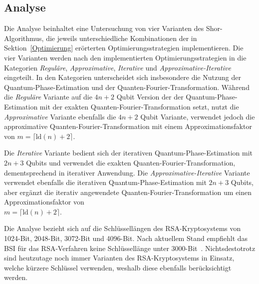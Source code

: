 \subsection*{Analyse}
Die Analyse beinhaltet eine Untersuchung von vier Varianten des Shor-Algorithmus, 
die jeweils unterschiedliche Kombinationen der in Sektion~\ref{Optimierung} erörterten Optimierungsstrategien implementieren.
Die vier Varianten werden nach den implementierten Optimierungsstrategien in die Kategorien \textit{Reguläre}, 
\textit{Approximative}, \textit{Iterative} und \textit{Approximative-Iterative} eingeteilt.
In den Kategorien unterscheidet sich insbesondere die Nutzung der Quantum-Phase-Estimation und der Quanten-Fourier-Transformation. 
Während die \textit{Reguläre} Variante auf die \(4n+2\) Qubit Version der der Quantum-Phase-Estimation mit der exakten Quanten-Fourier-Transformation setzt, 
nutzt die \textit{Approximative} Variante ebenfalls die \(4n+2\) Qubit Variante, 
verwendet jedoch die approximative Quanten-Fourier-Transformation mit einem Approximationsfaktor von \(m = \lceil\text{ld}(n)+2\rceil\).

Die \textit{Iterative} Variante bedient sich der iterativen Quantum-Phase-Estimation mit \(2n+3\) Qubits und 
verwendet die exakten Quanten-Fourier-Transformation, dementsprechend in iterativer Anwendung.
Die \textit{Approximative-Iterative} Variante verwendet ebenfalls die iterativen Quantum-Phase-Estimation mit \(2n+3\) Qubits, 
aber ergänzt die iterativ angewendete Quanten-Fourier-Transformation um einen Approximationsfaktor von \\\(m = \lceil\text{ld}(n)+2\rceil\).

Die Analyse bezieht sich auf die Schlüssellängen des RSA-Kryptosystems von 1024-Bit, 2048-Bit, 3072-Bit und 4096-Bit. 
Nach aktuellem Stand empfiehlt das BSI für das RSA-Verfahren keine Schlüssellänge unter 3000-Bit~\cite{BSI2023}. 
Nichtsdestotrotz sind heutzutage noch immer Varianten des RSA-Kryptosystems in Einsatz, welche kürzere Schlüssel verwenden, 
weshalb diese ebenfalls berücksichtigt werden.

\vspace{1em}

